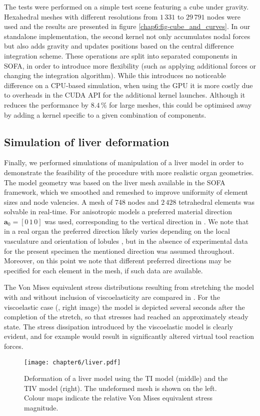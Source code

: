 The tests were performed on a simple test scene featuring a cube under gravity. Hexahedral meshes with different resolutions from $1\,331$ to $29\,791$ nodes were used and the results are presented in figure \ref{chap6:fig-cube_and_curves}. In our standalone implementation, the second kernel not only accumulates nodal forces but also adds gravity and updates positions based on the central difference integration scheme. These operations are split into separated components in SOFA, in order to introduce more flexibility (such as applying additional forces or changing the integration algorithm). While this introduces no noticeable difference on a CPU-based simulation, when using the GPU it is more costly due to overheads in the CUDA API for the additional kernel launches. Although it reduces the performance by $8.4\, \%$ for large meshes, this could be optimised away by adding a kernel specific to a given combination of components.
		
	
	\subsection{Simulation of liver deformation} \label{chap6:liverSimu}
Finally, we performed simulations of manipulation of a liver model in order to demonstrate the feasibility of the procedure with more realistic organ geometries. The model geometry was based on the liver mesh available in the SOFA framework, which we smoothed and remeshed to improve uniformity of element sizes and node valencies. A mesh of 748 nodes and $2\,428$ tetrahedral elements was solvable in real-time. For anisotropic models a preferred material direction $\mathbf{a}_0 = [0\, 1\, 0] $ was used, corresponding to the vertical direction in . We note that in a real organ the preferred direction likely varies depending on the local vasculature and orientation of lobules \citep{Chui07}, but in the absence of experimental data for the present specimen the mentioned direction was assumed throughout. Moreover, on this point we note that different preferred directions may be specified for each element in the mesh, if such data are available. 

\bigskip

The Von Mises equivalent stress distributions resulting from stretching the model with and without inclusion of viscoelasticity are compared in . For the viscoelastic case (, right image) the model is depicted several seconds after the completion of the stretch, so that stresses had reached an approximately steady state. The stress dissipation introduced by the viscoelastic model is clearly evident, and for example would result in significantly altered virtual tool reaction forces.	
%
\begin{figure}[h]
\begin{center}
\texttt{[image: chapter6/liver.pdf]}
\end{center}
\caption[GPU solution times]{Deformation of a liver model using the TI model (middle) and the TIV model (right). The undeformed mesh is shown on the left. Colour maps indicate the relative Von Mises equivalent stress magnitude.} 
\label{chap6:fig-liver}
\end{figure}
	
